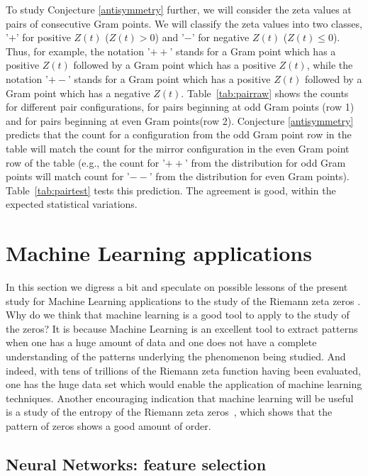 \documentclass[twoside]{article}
\theoremstyle{definition}
\begin{document}
{To study Conjecture \ref{antisymmetry} further, we will consider the zeta values at pairs of consecutive Gram points. We will classify the zeta values into two classes, '$+$' for positive $Z(t)$  ($Z(t) > 0$) and '$-$' for negative $Z(t)$ ($Z(t) \leqslant  0$). Thus, for example, the notation '$++$' stands for a Gram point which has a positive $Z(t)$ followed by a Gram point which has a positive $Z(t)$, while the notation '$+-$' stands for a Gram point which has a positive $Z(t)$ followed by a Gram point which has a negative $Z(t)$. Table~\ref{tab:pairraw} shows the counts for different pair configurations, for pairs beginning at odd Gram points (row 1) and for pairs beginning at even Gram points(row 2). Conjecture \ref{antisymmetry} predicts that the count for a configuration from the odd Gram point row in the table  will match the count for the mirror configuration in the even Gram point row of the table (e.g., the count for '$++$' from the distribution for odd Gram points will match count for '$--$' from the distribution for even Gram points). Table~\ref{tab:pairtest} tests this prediction. The agreement is good, within the expected statistical variations. 

\section{\label{machineLearning}Machine Learning applications}

 { 
In this section we digress a bit and speculate on possible lessons of the present study for Machine Learning applications to the study of the Riemann zeta zeros \cite{osneural,osentropy}.
Why do we think that machine learning is a good tool to apply to the study of the zeros? It is because Machine Learning is an excellent tool to extract patterns when one has a huge amount of data and one does not have a complete understanding of the patterns underlying the phenomenon being studied. And indeed, with tens of trillions of the Riemann zeta function having been evaluated, one has the huge data set which would enable the application of machine learning techniques. Another encouraging indication that machine learning will be useful is a study of the entropy of the Riemann zeta zeros~\cite{osentropy}, which shows that the pattern of zeros shows a good amount of order.
}
\subsection{\label{secfeature}Neural Networks: feature selection}
 
}
\end{document}
